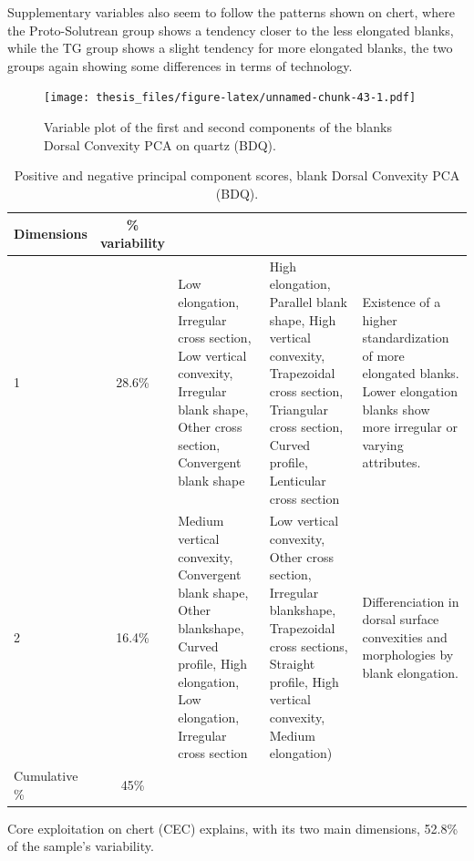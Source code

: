 \documentclass[12pt,twoside]{reedthesis}
\begin{document}
Supplementary variables also seem to follow the patterns shown on chert, where the Proto-Solutrean group shows a tendency closer to the less elongated blanks, while the TG group shows a slight tendency for more elongated blanks, the two groups again showing some differences in terms of technology.
\begin{figure}
\centering
\texttt{[image: thesis\_files/figure-latex/unnamed-chunk-43-1.pdf]}
\caption{\label{fig:unnamed-chunk-43}Variable plot of the first and second components of the blanks Dorsal Convexity PCA on quartz (BDQ).}
\end{figure}
\begin{table}

\caption{\label{tab:unnamed-chunk-44}Positive and negative principal component scores, blank Dorsal Convexity PCA (BDQ).}
\centering
\begin{tabular}[t]{lc>{\raggedright\arraybackslash}p{3cm}>{\raggedright\arraybackslash}p{3cm}>{\raggedright\arraybackslash}p{3cm}}
\toprule
\multicolumn{1}{c}{\textbf{Dimensions}} & \multicolumn{1}{c}{\textbf{\% variability}} & \multicolumn{1}{>{\centering\arraybackslash}p{3cm}}{\textbf{+}} & \multicolumn{1}{>{\centering\arraybackslash}p{3cm}}{\textbf{-}} & \multicolumn{1}{>{\centering\arraybackslash}p{3cm}}{\textbf{Interpretation}}\\
\midrule
1 & 28.6\% & Low elongation, Irregular cross section, Low vertical convexity, Irregular blank shape, Other cross section, Convergent blank shape & High elongation, Parallel blank shape, High vertical convexity, Trapezoidal cross section, Triangular cross section, Curved profile, Lenticular cross section & Existence of a higher standardization of more elongated blanks. Lower elongation blanks show more irregular or varying attributes.\\
2 & 16.4\% & Medium vertical convexity, Convergent blank shape, Other blankshape, Curved profile, High elongation, Low elongation, Irregular cross section & Low vertical convexity, Other cross section, Irregular blankshape, Trapezoidal cross sections, Straight profile, High vertical convexity, Medium elongation) & Differenciation in dorsal surface convexities and morphologies by blank elongation.\\
Cumulative \% & 45\% &  &  & \\
\bottomrule
\end{tabular}
\end{table}
Core exploitation on chert (CEC) explains, with its two main dimensions, 52.8\% of the sample's variability.
\end{document}
